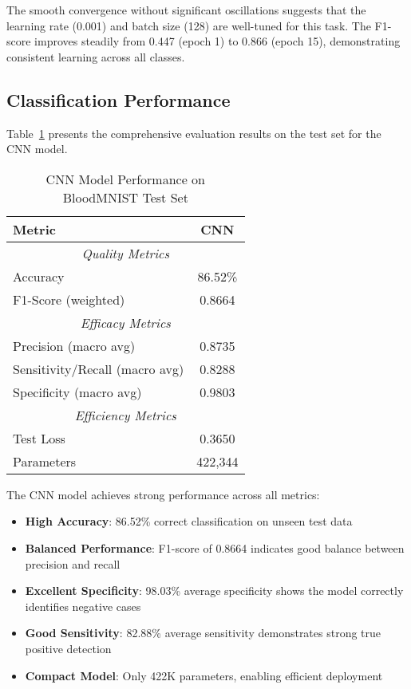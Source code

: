 \documentclass[runningheads]{llncs}
\begin{document}
The smooth convergence without significant oscillations suggests that the learning rate (0.001) and batch size (128) are well-tuned for this task. The F1-score improves steadily from 0.447 (epoch 1) to 0.866 (epoch 15), demonstrating consistent learning across all classes.

\subsection{Classification Performance}

Table~\ref{tab:results} presents the comprehensive evaluation results on the test set for the CNN model.

\begin{table}[htbp]
\centering
\caption{CNN Model Performance on BloodMNIST Test Set}
\label{tab:results}
\begin{tabular}{lc}
\toprule
\textbf{Metric} & \textbf{CNN} \\
\midrule
\multicolumn{2}{c}{\textit{Quality Metrics}} \\
Accuracy & 86.52\% \\
F1-Score (weighted) & 0.8664 \\
\midrule
\multicolumn{2}{c}{\textit{Efficacy Metrics}} \\
Precision (macro avg) & 0.8735 \\
Sensitivity/Recall (macro avg) & 0.8288 \\
Specificity (macro avg) & 0.9803 \\
\midrule
\multicolumn{2}{c}{\textit{Efficiency Metrics}} \\
Test Loss & 0.3650 \\
Parameters & 422,344 \\
\bottomrule
\end{tabular}
\end{table}

The CNN model achieves strong performance across all metrics:
\begin{itemize}
    \item \textbf{High Accuracy}: 86.52\% correct classification on unseen test data
    \item \textbf{Balanced Performance}: F1-score of 0.8664 indicates good balance between precision and recall
    \item \textbf{Excellent Specificity}: 98.03\% average specificity shows the model correctly identifies negative cases
    \item \textbf{Good Sensitivity}: 82.88\% average sensitivity demonstrates strong true positive detection
    \item \textbf{Compact Model}: Only 422K parameters, enabling efficient deployment
\end{itemize}
\end{document}
